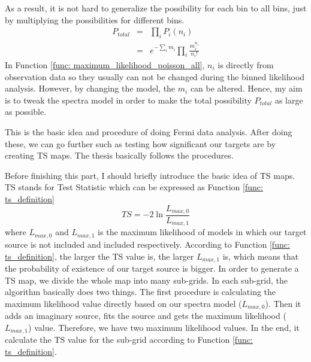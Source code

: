 \documentclass[12pt]{report}
\begin{document}
          As a result, it is not hard to generalize the possibility for each bin to all bins, just 
          by multiplying the possibilities for different bins.
          \begin{eqnarray}
            P_{total} &=& \prod_{i}^{}P_{i}\left(n_{i}\right) \nonumber \\ 
                      &=& e^{-\sum_{i}^{}m_i}\prod_{i}^{}\frac{m_{i}^{n_i}}{n_i!}
            \label{func: maximum_likelihood_poisson_all}
          \end{eqnarray}
          In Function \ref{func: maximum_likelihood_poisson_all}, $n_i$ is directly 
          from observation data so they usually can not be changed during the binned likelihood 
          analysis. However, by changing the model, the $m_i$ can be altered. 
          Hence, my aim is to tweak the spectra model in order to make the total possibility 
          $P_{total}$ as large as possible. 

          This is the basic idea and procedure of doing Fermi data analysis. After doing these,
          we can go further such as testing how significant our targets are by creating TS maps. The 
          thesis basically follows the procedures. 

          Before finishing this part, I should briefly introduce the basic idea of TS maps. 
          TS stands for Test Statistic which can be expressed as Function \ref{func: ts_definition}
          \begin{equation}
            TS = -2 \ln{\frac{L_{max,0}}{L_{max,1}}}
            \label{func: ts_definition}
          \end{equation}
          where $L_{max,0}$ and $L_{max,1}$ is the maximum likelihood of models in which our 
          target source is not included and included respectively. According to Function 
          \ref{func: ts_definition}, the larger the TS value is, the larger $L_{max, 1}$ is, which
          means that the probability of existence of our target source is bigger. 
          In order to generate a TS map, we divide the whole map into many sub-grids. In each sub-grid,
          the algorithm basically does two things. The first procedure is calculating the maximum likelihood value
          directly based on our spectra model ($L_{max,0}$). Then it adds an imaginary source, fits the source 
          and gets the maximum likelihood ($L_{max, 1}$) value. Therefore, we have two maximum likelihood values.
          In the end, it calculate the TS value for the 
          sub-grid according to Function \ref{func: ts_definition}. 
\end{document}
